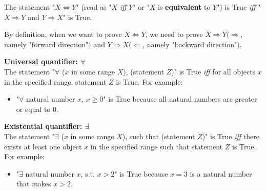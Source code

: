 \documentclass[main.tex]{subfiles}
\begin{document}
\begin{definition}
    The statement "$X \Leftrightarrow Y$" (read as "$X$ \textit{iff} $Y$" or "$X$ is \textbf{equivalent} to $Y$") is True \textit{iff} "$X \Rightarrow Y$ and $Y \Rightarrow X$" is True.
\end{definition}

\begin{remark}
    By definition, when we want to prove $X \Leftrightarrow Y$, we need to prove $X \Rightarrow Y (\Rightarrow$, namely "forward direction"$)$ and $Y \Rightarrow X (\Leftarrow$, namely "backward direction"$)$.
\end{remark}

\begin{definition}
    \textbf{Universal quantifier: $\forall$}\\
    The statement "$\forall$ ($x$ in some range $X$), (statement $Z$)" is True \textit{iff} for all objects $x$ in the specified range, statement $Z$ is True. For example:
    \begin{itemize}
        \item "$\forall $ natural number $x$, $x\ge 0$" is True because all natural numbers are greater or equal to 0.
    \end{itemize}
\end{definition}

\begin{definition}
    \textbf{Existential quantifier: $\exists$}\\
    The statement "$\exists$ ($x$ in some range $X$), such that (statement $Z$)" is True \textit{iff} there exists at least one object $x$ in the specified range such that statement $Z$ is True. For example:
    \begin{itemize}
        \item "$\exists$ natural number $x$, s.t. $x>2$" is True because $x=3$ is a natural number that makes $x>2$.
    \end{itemize}
\end{definition}
\end{document}
